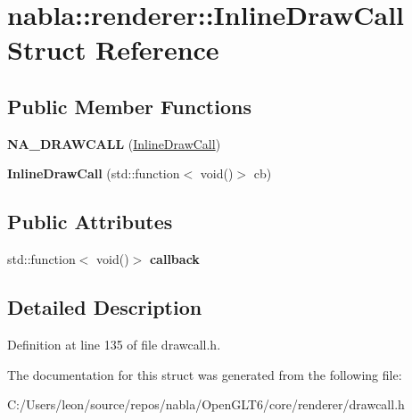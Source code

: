 \hypertarget{structnabla_1_1renderer_1_1_inline_draw_call}{}\section{nabla\+::renderer\+::Inline\+Draw\+Call Struct Reference}
\label{structnabla_1_1renderer_1_1_inline_draw_call}
\subsection*{Public Member Functions}
\begin{DoxyCompactItemize}
\item 
\mbox{\label{structnabla_1_1renderer_1_1_inline_draw_call_a321c121d2a98277420818bc16db5c9b0}} 
{\bfseries N\+A\+\_\+\+D\+R\+A\+W\+C\+A\+LL} (\mbox{\hyperlink{structnabla_1_1renderer_1_1_inline_draw_call}{Inline\+Draw\+Call}})
\item 
\mbox{\label{structnabla_1_1renderer_1_1_inline_draw_call_ac2f7309befd4166c8fc7e28146cc3e3d}} 
{\bfseries Inline\+Draw\+Call} (std\+::function$<$ void()$>$ cb)
\end{DoxyCompactItemize}
\subsection*{Public Attributes}
\begin{DoxyCompactItemize}
\item 
\mbox{\label{structnabla_1_1renderer_1_1_inline_draw_call_a8416bde9df0cbb64fc07760b14c0c563}} 
std\+::function$<$ void()$>$ {\bfseries callback}
\end{DoxyCompactItemize}


\subsection{Detailed Description}


Definition at line 135 of file drawcall.\+h.



The documentation for this struct was generated from the following file\+:\begin{DoxyCompactItemize}
\item 
C\+:/\+Users/leon/source/repos/nabla/\+Open\+G\+L\+T6/core/renderer/drawcall.\+h\end{DoxyCompactItemize}
